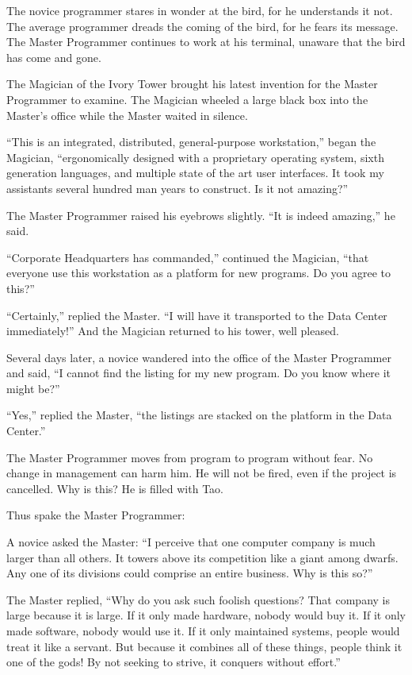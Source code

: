 The novice programmer stares in wonder at the bird, for he understands it not. The average programmer dreads the coming of the bird, for he fears its message. The Master Programmer continues to work at his terminal, unaware that the bird has come and gone.

The Magician of the Ivory Tower brought his latest invention for the Master Programmer to examine. The Magician wheeled a large black box into the Master's office while the Master waited in silence.

``This is an integrated, distributed, general-purpose workstation,'' began the Magician, ``ergonomically designed with a proprietary operating system, sixth generation languages, and multiple state of the art user interfaces. It took my assistants several hundred man years to construct. Is it not amazing?''

The Master Programmer raised his eyebrows slightly. ``It is indeed amazing,'' he said.

``Corporate Headquarters has commanded,'' continued the Magician, ``that everyone use this workstation as a platform for new programs. Do you agree to this?''

``Certainly,'' replied the Master. ``I will have it transported to the Data Center immediately!'' And the Magician returned to his tower, well pleased.

Several days later, a novice wandered into the office of the Master Programmer and said, ``I cannot find the listing for my new program. Do you know where it might be?''

``Yes,'' replied the Master, ``the listings are stacked on the platform in the Data Center.''

The Master Programmer moves from program to program without fear. No change in management can harm him. He will not be fired, even if the project is cancelled. Why is this? He is filled with Tao.

Thus spake the Master Programmer:

A novice asked the Master: ``I perceive that one computer company is much larger than all others. It towers above its competition like a giant among dwarfs. Any one of its divisions could comprise an entire business. Why is this so?''

The Master replied, ``Why do you ask such foolish questions? That company is large because it is large. If it only made hardware, nobody would buy it. If it only made software, nobody would use it. If it only maintained systems, people would treat it like a servant. But because it combines all of these things, people think it one of the gods! By not seeking to strive, it conquers without effort.''


